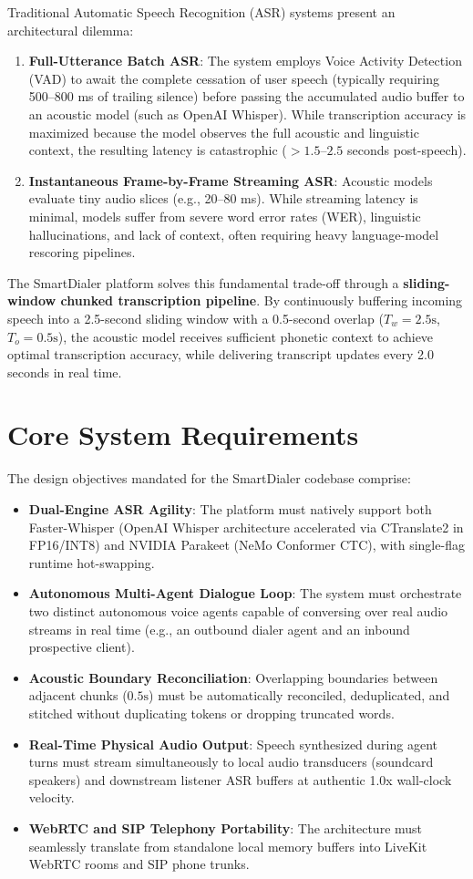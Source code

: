 \documentclass[11pt,a4paper,titlepage]{report}
\begin{document}
Traditional Automatic Speech Recognition (ASR) systems present an architectural dilemma:
\begin{enumerate}[label=\textbf{\arabic*.}]
    \item \textbf{Full-Utterance Batch ASR}: The system employs Voice Activity Detection (VAD) to await the complete cessation of user speech (typically requiring 500--800 ms of trailing silence) before passing the accumulated audio buffer to an acoustic model (such as OpenAI Whisper). While transcription accuracy is maximized because the model observes the full acoustic and linguistic context, the resulting latency is catastrophic ($>1.5$--$2.5$ seconds post-speech).
    \item \textbf{Instantaneous Frame-by-Frame Streaming ASR}: Acoustic models evaluate tiny audio slices (e.g., 20--80 ms). While streaming latency is minimal, models suffer from severe word error rates (WER), linguistic hallucinations, and lack of context, often requiring heavy language-model rescoring pipelines.
\end{enumerate}

The SmartDialer platform solves this fundamental trade-off through a \textbf{sliding-window chunked transcription pipeline}. By continuously buffering incoming speech into a 2.5-second sliding window with a 0.5-second overlap ($T_w=2.5\text{s}$, $T_o=0.5\text{s}$), the acoustic model receives sufficient phonetic context to achieve optimal transcription accuracy, while delivering transcript updates every 2.0 seconds in real time.

\section{Core System Requirements}
The design objectives mandated for the SmartDialer codebase comprise:
\begin{itemize}
    \item \textbf{Dual-Engine ASR Agility}: The platform must natively support both Faster-Whisper (OpenAI Whisper architecture accelerated via CTranslate2 in FP16/INT8) and NVIDIA Parakeet (NeMo Conformer CTC), with single-flag runtime hot-swapping.
    \item \textbf{Autonomous Multi-Agent Dialogue Loop}: The system must orchestrate two distinct autonomous voice agents capable of conversing over real audio streams in real time (e.g., an outbound dialer agent and an inbound prospective client).
    \item \textbf{Acoustic Boundary Reconciliation}: Overlapping boundaries between adjacent chunks ($0.5\text{s}$) must be automatically reconciled, deduplicated, and stitched without duplicating tokens or dropping truncated words.
    \item \textbf{Real-Time Physical Audio Output}: Speech synthesized during agent turns must stream simultaneously to local audio transducers (soundcard speakers) and downstream listener ASR buffers at authentic 1.0x wall-clock velocity.
    \item \textbf{WebRTC and SIP Telephony Portability}: The architecture must seamlessly translate from standalone local memory buffers into LiveKit WebRTC rooms and SIP phone trunks.
\end{itemize}
\end{document}
